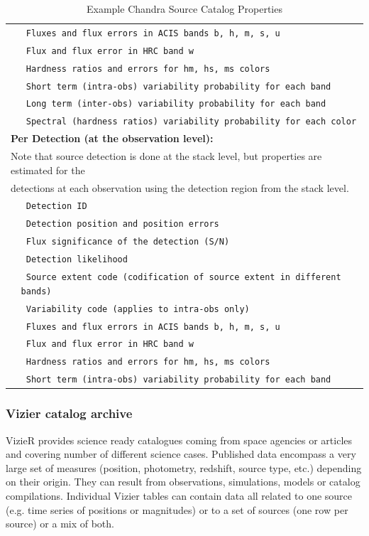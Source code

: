 \documentclass[11pt,a4paper]{ivoa}
\begin{document}
\begin{itemize}
\begin{table}[ht!]
\begin{tabular}{|p{0.4cm}p{10.0cm}|}
    & \texttt{ Fluxes and flux errors in ACIS bands b, h, m, s, u } \\
    & \texttt{ Flux and flux error in  HRC band w } \\
    & \texttt{ Hardness ratios and errors for hm, hs, ms colors } \\
    & \texttt{ Short term (intra-obs) variability probability for each band } \\
    & \texttt{ Long term (inter-obs) variability probability for each band } \\
    & \texttt{ Spectral (hardness ratios) variability probability for each color } \\
    \hline
    \multicolumn{2}{|l|}{\textbf{Per Detection (at the observation level):}} \\
    \multicolumn{2}{|l|}{ Note that source detection is done at the stack level, but properties are estimated for the } \\
    \multicolumn{2}{|l|}{detections at each observation using the detection region from the stack level.} \\
    & \texttt{ Detection ID } \\
    & \texttt{ Detection position and position errors } \\
    & \texttt{ Flux significance of the detection (S/N) } \\
    & \texttt{ Detection likelihood } \\
    & \texttt{ Source extent code (codification of source extent in different bands) } \\
    & \texttt{ Variability code (applies to intra-obs only) } \\
    & \texttt{ Fluxes and flux errors in ACIS bands b, h, m, s, u } \\
    & \texttt{ Flux and flux error in  HRC band w } \\
    & \texttt{ Hardness ratios and errors for hm, hs, ms colors } \\
    & \texttt{ Short term (intra-obs) variability probability for each band } \\
    \hline

  \end{tabular}
  \caption{ Example Chandra Source Catalog Properties }
  \label{tab:chandra_props}

 \end{table}
 
\subsubsection{Vizier catalog archive}
VizieR provides science ready catalogues coming from space agencies or articles and covering number of different science cases.
Published data encompass a very large set of measures (position, photometry, redshift, source type, etc.) depending on their origin.
They can result from  observations, simulations, models or catalog compilations.
Individual Vizier tables can contain data all related to one source (e.g. time series of positions or magnitudes) or to a set of sources (one row per source) or a mix of both.


\end{itemize}
\end{document}
